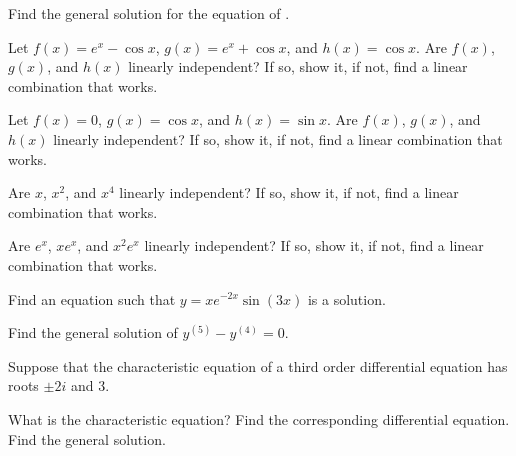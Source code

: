 \begin{exercise}
Find the general solution for the equation of .
\end{exercise}

\begin{exercise}
Let
$f(x) = e^x - \cos x$, $g(x) = e^x + \cos x$, and $h(x) = \cos x$.
Are $f(x)$, $g(x)$, and $h(x)$
linearly independent?  If so, show
it, if not, find a linear combination that works.
\end{exercise}

\begin{exercise}
Let
$f(x) = 0$, $g(x) = \cos x$, and $h(x) = \sin x$.
Are $f(x)$, $g(x)$, and $h(x)$
linearly independent?  If so, show
it, if not, find a linear combination that works.
\end{exercise}

\begin{exercise}
Are $x$, $x^2$, and $x^4$
linearly independent?  If so, show
it, if not, find a linear combination that works.
\end{exercise}

\begin{exercise}
Are $e^x$, $xe^x$, and $x^2e^x$
linearly independent?  If so, show
it, if not, find a linear combination that works.
\end{exercise}

\begin{exercise}
Find an equation such that $y=xe^{-2x}\sin(3x)$ is a solution.
\end{exercise}

\setcounter{exercise}{100}

\begin{exercise}
Find the general solution of $y^{(5)}-y^{(4)}=0$.
\end{exercise}

\begin{exercise}
\pagebreak[2]
Suppose that the characteristic equation of a third order differential
equation has
roots $\pm 2i$ and 3.
\begin{tasks}
\task
What is the characteristic equation?
\task
Find the
corresponding differential equation.
\task
Find the general solution.
\end{tasks}
\end{exercise}

